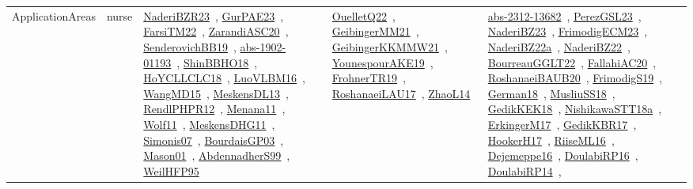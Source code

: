 {\begin{longtable}{lp{3cm}>{\raggedright\arraybackslash}p{6cm}>{\raggedright\arraybackslash}p{6cm}>{\raggedright\arraybackslash}p{8cm}}
\index{nurse}\index{ApplicationAreas!nurse}ApplicationAreas & nurse & \href{../works/NaderiBZR23.pdf}{NaderiBZR23}~\cite{NaderiBZR23}, \href{../works/GurPAE23.pdf}{GurPAE23}~\cite{GurPAE23}, \href{../works/FarsiTM22.pdf}{FarsiTM22}~\cite{FarsiTM22}, \href{../works/ZarandiASC20.pdf}{ZarandiASC20}~\cite{ZarandiASC20}, \href{../works/SenderovichBB19.pdf}{SenderovichBB19}~\cite{SenderovichBB19}, \href{../works/abs-1902-01193.pdf}{abs-1902-01193}~\cite{abs-1902-01193}, \href{../works/ShinBBHO18.pdf}{ShinBBHO18}~\cite{ShinBBHO18}, \href{../works/HoYCLLCLC18.pdf}{HoYCLLCLC18}~\cite{HoYCLLCLC18}, \href{../works/LuoVLBM16.pdf}{LuoVLBM16}~\cite{LuoVLBM16}, \href{../works/WangMD15.pdf}{WangMD15}~\cite{WangMD15}, \href{../works/MeskensDL13.pdf}{MeskensDL13}~\cite{MeskensDL13}, \href{../works/RendlPHPR12.pdf}{RendlPHPR12}~\cite{RendlPHPR12}, \href{../works/Menana11.pdf}{Menana11}~\cite{Menana11}, \href{../works/Wolf11.pdf}{Wolf11}~\cite{Wolf11}, \href{../works/MeskensDHG11.pdf}{MeskensDHG11}~\cite{MeskensDHG11}, \href{../works/Simonis07.pdf}{Simonis07}~\cite{Simonis07}, \href{../works/BourdaisGP03.pdf}{BourdaisGP03}~\cite{BourdaisGP03}, \href{../works/Mason01.pdf}{Mason01}~\cite{Mason01}, \href{../works/AbdennadherS99.pdf}{AbdennadherS99}~\cite{AbdennadherS99}, \href{../works/WeilHFP95.pdf}{WeilHFP95}~\cite{WeilHFP95} & \href{../works/OuelletQ22.pdf}{OuelletQ22}~\cite{OuelletQ22}, \href{../works/GeibingerMM21.pdf}{GeibingerMM21}~\cite{GeibingerMM21}, \href{../works/GeibingerKKMMW21.pdf}{GeibingerKKMMW21}~\cite{GeibingerKKMMW21}, \href{../works/YounespourAKE19.pdf}{YounespourAKE19}~\cite{YounespourAKE19}, \href{../works/FrohnerTR19.pdf}{FrohnerTR19}~\cite{FrohnerTR19}, \href{../works/RoshanaeiLAU17.pdf}{RoshanaeiLAU17}~\cite{RoshanaeiLAU17}, \href{../works/ZhaoL14.pdf}{ZhaoL14}~\cite{ZhaoL14} & \href{../works/abs-2312-13682.pdf}{abs-2312-13682}~\cite{abs-2312-13682}, \href{../works/PerezGSL23.pdf}{PerezGSL23}~\cite{PerezGSL23}, \href{../works/NaderiBZ23.pdf}{NaderiBZ23}~\cite{NaderiBZ23}, \href{../works/FrimodigECM23.pdf}{FrimodigECM23}~\cite{FrimodigECM23}, \href{../works/NaderiBZ22a.pdf}{NaderiBZ22a}~\cite{NaderiBZ22a}, \href{../works/NaderiBZ22.pdf}{NaderiBZ22}~\cite{NaderiBZ22}, \href{../works/BourreauGGLT22.pdf}{BourreauGGLT22}~\cite{BourreauGGLT22}, \href{../works/FallahiAC20.pdf}{FallahiAC20}~\cite{FallahiAC20}, \href{../works/RoshanaeiBAUB20.pdf}{RoshanaeiBAUB20}~\cite{RoshanaeiBAUB20}, \href{../works/FrimodigS19.pdf}{FrimodigS19}~\cite{FrimodigS19}, \href{../works/German18.pdf}{German18}~\cite{German18}, \href{../works/MusliuSS18.pdf}{MusliuSS18}~\cite{MusliuSS18}, \href{../works/GedikKEK18.pdf}{GedikKEK18}~\cite{GedikKEK18}, \href{../works/NishikawaSTT18a.pdf}{NishikawaSTT18a}~\cite{NishikawaSTT18a}, \href{../works/ErkingerM17.pdf}{ErkingerM17}~\cite{ErkingerM17}, \href{../works/GedikKBR17.pdf}{GedikKBR17}~\cite{GedikKBR17}, \href{../works/HookerH17.pdf}{HookerH17}~\cite{HookerH17}, \href{../works/RiiseML16.pdf}{RiiseML16}~\cite{RiiseML16}, \href{../works/Dejemeppe16.pdf}{Dejemeppe16}~\cite{Dejemeppe16}, \href{../works/DoulabiRP16.pdf}{DoulabiRP16}~\cite{DoulabiRP16}, \href{../works/DoulabiRP14.pdf}{DoulabiRP14}~\cite{DoulabiRP14}, 
\end{longtable}}

